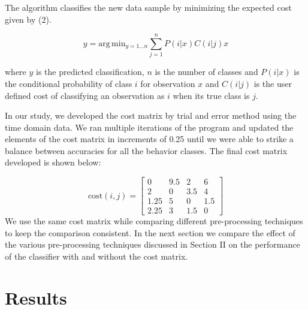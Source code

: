 \documentclass[conference]{IEEEtran}
\begin{document}
The algorithm classifies the new data sample by minimizing the expected cost given by (2).

\begin{equation}
	y = \mathrm{arg} \, \mathrm{min}_{y = 1 \ldots n} \sum^n_{j=1} P(i|x) C(i|j)x
\end{equation}

where $y$ is the predicted classification, $n$ is the number of classes and $P(i|x)$ is the conditional probability of class $i$ for observation $x$ and $C(i|j)$ is the user defined cost of classifying an observation as $i$ when its true class is $j$.

In our study, we developed the cost matrix by trial and error method using the time domain data. We ran multiple iterations of the program and updated the elements of the cost matrix in increments of 0.25 until we were able to strike a balance between accuracies for all the behavior classes. The final cost matrix developed is shown below:

$$
\mathrm{cost}(i, j) = \begin{bmatrix}
	0 & 9.5 & 2 & 6 \\
	2 & 0 & 3.5 & 4 \\
	1.25 & 5 & 0 & 1.5 \\
	2.25 & 3 & 1.5 & 0
\end{bmatrix}
$$
 We use the same cost matrix while comparing different pre-processing techniques to keep the comparison consistent. In the next section we compare the effect of the various pre-processing techniques discussed in Section II on the performance of the classifier with and without the cost matrix.
 
\section{Results}
\end{document}

